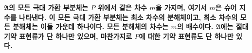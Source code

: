 \documentclass[11pt]{article}
\providecommand{\mA}{\mathfrak{A}}
\providecommand{\srcspaced}[1]{\textbf{#1}}
\begin{document}
\srcspaced{$\mA$의 모든 극대 가환 부분체는 $P$ 위에서 같은 차수 $m$을 가지며, 여기서 $m$은 슈어 지수를 나타낸다. 이 모든 극대 가환 부분체는 최소 차수의 분해체이고, 최소 차수의 모든 분해체는 이들 가운데 하나이다. 모든 분해체의 차수는 $m$의 배수이다. $\mA$에는 절대기약 표현류가 단 하나만 있으며, 마찬가지로 $P$에 대한 기약 표현류도 단 하나만 있다.}
\end{document}
